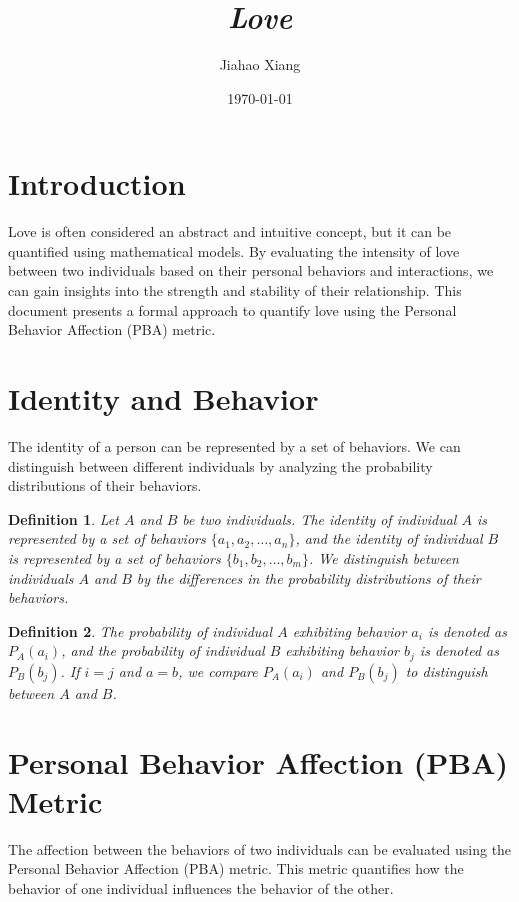 \documentclass{article}
\title{\textit{Love}}
\author{Jiahao Xiang}
\date{\today}
\newtheorem{definition}{Definition}
\begin{document}
\maketitle

\section{Introduction}
Love is often considered an abstract and intuitive concept, but it can be quantified using mathematical models. By evaluating the intensity of love between two individuals based on their personal behaviors and interactions, we can gain insights into the strength and stability of their relationship. This document presents a formal approach to quantify love using the Personal Behavior Affection (PBA) metric.

\section{Identity and Behavior}
The identity of a person can be represented by a set of behaviors. We can distinguish between different individuals by analyzing the probability distributions of their behaviors.

\begin{definition}
    Let $A$ and $B$ be two individuals. The identity of individual $A$ is represented by a set of behaviors $\{a_1, a_2, \dots, a_n\}$, and the identity of individual $B$ is represented by a set of behaviors $\{b_1, b_2, \dots, b_m\}$. We distinguish between individuals $A$ and $B$ by the differences in the probability distributions of their behaviors.
\end{definition}

\begin{definition}
    The probability of individual $A$ exhibiting behavior $a_i$ is denoted as $P_A(a_i)$, and the probability of individual $B$ exhibiting behavior $b_j$ is denoted as $P_B(b_j)$. If $i = j$ and $a = b$, we compare $P_A(a_i)$ and $P_B(b_j)$ to distinguish between $A$ and $B$.
\end{definition}

\section{Personal Behavior Affection (PBA) Metric}
The affection between the behaviors of two individuals can be evaluated using the Personal Behavior Affection (PBA) metric. This metric quantifies how the behavior of one individual influences the behavior of the other.
\end{document}
